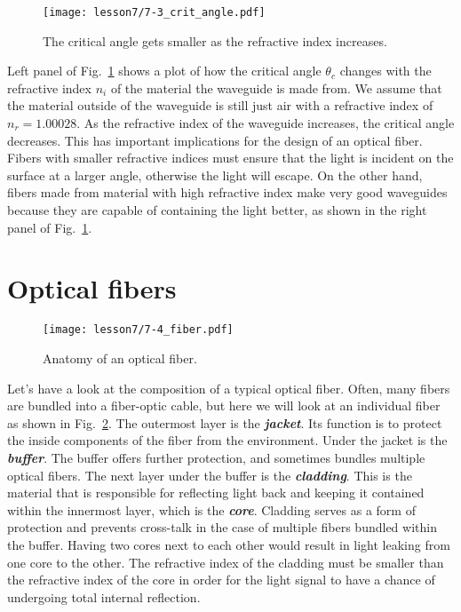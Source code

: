 \begin{figure}
    \centering
    \texttt{[image: lesson7/7-3\_crit\_angle.pdf]}
    \caption[Critical angle.]{The critical angle gets smaller as the refractive index increases.}
    \label{fig:7-3_crit_angle}
\end{figure}

Left panel of Fig.~\ref{fig:7-3_crit_angle} shows a plot of how the critical angle $\theta_c$ changes with the refractive index $n_i$ of the material the waveguide is made from.
We assume that the material outside of the waveguide is still just air with a refractive index of $n_r = 1.00028$.
As the refractive index of the waveguide increases, the critical angle decreases.
This has important implications for the design of an optical fiber.
Fibers with smaller refractive indices must ensure that the light is incident on the surface at a larger angle, otherwise the light will escape.
On the other hand, fibers made from material with high refractive index make very good waveguides because they are capable of containing the light better, as shown in the right panel of Fig.~\ref{fig:7-3_crit_angle}.


\section{Optical fibers}
\label{sec:7-4_optical fibers}

\begin{figure}[t]
    \centering
    \texttt{[image: lesson7/7-4\_fiber.pdf]}
    \caption[Anatomy of an optical fiber.]{Anatomy of an optical fiber.}
    \label{fig:7-4_fiber}
\end{figure}

Let's have a look at the composition of a typical optical fiber.
Often, many fibers are bundled into a fiber-optic cable, but here we will look at an individual fiber as shown in Fig.~\ref{fig:7-4_fiber}. 
The outermost layer is the \textbf{\emph{jacket}}.
Its function is to protect the inside components of the fiber from the environment.
Under the jacket is the \textbf{\emph{buffer}}.
The buffer offers further protection, and sometimes bundles multiple optical fibers.
The next layer under the buffer is the \textbf{\emph{cladding}}.
This is the material that is responsible for reflecting light back and keeping it contained within the innermost layer, which is the \textbf{\emph{core}}.
Cladding serves as a form of protection and prevents cross-talk in the case of multiple fibers bundled within the buffer.
Having two cores next to each other would result in light leaking from one core to the other.
The refractive index of the cladding must be smaller than the refractive index of the core in order for the light signal to have a chance of undergoing total internal reflection.


